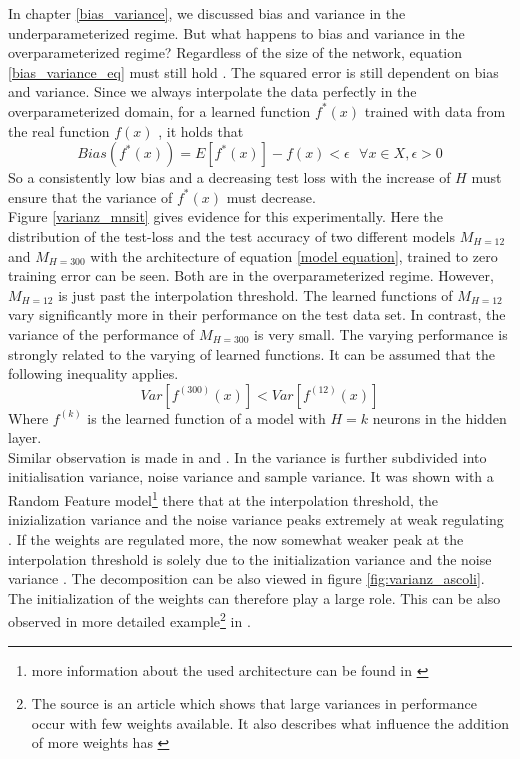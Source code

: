 In chapter \ref{bias_variance}, we discussed bias and variance in the underparameterized regime. But what happens to bias and variance in the overparameterized regime? Regardless of the size of the network, equation \ref{bias_variance_eq} must still hold \cite{bias_variance_op}. 
The squared error is still dependent on bias and variance. Since we always interpolate the data perfectly in the overparameterized domain, for a learned function $f^*(x)$ trained with data from the real function $f(x)$ , it holds that 
$$
Bias(f^*(x)) = E[f^*(x)] - f(x) < \epsilon  \text{  }  \forall x \in X, \epsilon > 0
$$
So a consistently low bias and a decreasing test loss with the increase of $H$ must ensure that the variance of $f^*(x)$ must decrease. \\
Figure \ref{varianz_mnsit} gives evidence for this experimentally. Here the distribution of the test-loss and the test accuracy of two different models $M_{H = 12}$ and $M_{H = 300}$ with the architecture of equation \ref{model equation}, trained to zero training error can be seen. Both are in the overparameterized regime. However, $M_{H = 12}$ is just past the interpolation threshold. The learned functions of $M_{H=12}$ vary significantly more in their performance on the test data set. In contrast, the variance of the performance of $M_{H=300}$ is very small. The varying performance is strongly related to the varying of learned functions. It can be assumed that the following inequality applies.
$$
Var[f^{(300)}(x)] < Var[f^{(12)}(x)]
$$
Where $f^{(k)}$ is the learned function of a model with $H = k$ neurons in the hidden layer. \\
Similar observation is made in \cite{pmlr-v119-d-ascoli20a} and \cite{bias_variance_op}. In \cite{pmlr-v119-d-ascoli20a} the variance is further subdivided into initialisation variance, noise variance and sample variance. It was shown with a Random Feature model\footnote{more information about the used architecture can be found in \cite{RF-model}} there that at the interpolation threshold, the inizialization variance and the noise variance peaks extremely at weak regulating \cite{pmlr-v119-d-ascoli20a}. If the weights are regulated more, the now somewhat weaker peak at the interpolation threshold is solely due to the initialization variance and the noise variance \cite{pmlr-v119-d-ascoli20a}. The decomposition can be also viewed in figure \ref{fig:varianz_ascoli}. \\
The initialization of the weights can therefore play a large role. This can be also observed in more detailed example\footnote{The source is an article which shows that large variances in performance occur with few weights available. It also describes what influence the addition of more weights has \cite{double_descent_2021_splines}} in \cite{double_descent_2021_splines}. 
